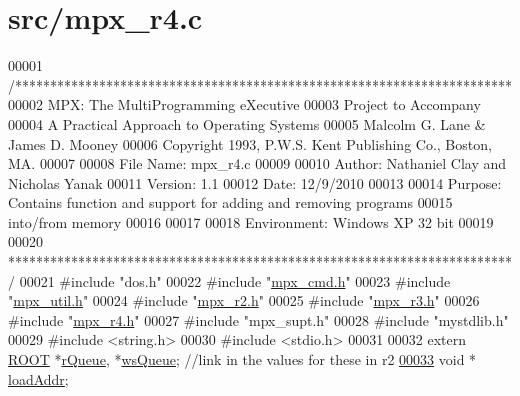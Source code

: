 \hypertarget{mpx__r4_8c_source}{
\section{src/mpx\_\-r4.c}
}

\begin{DoxyCode}
00001 \textcolor{comment}{/***********************************************************************}
00002 \textcolor{comment}{        MPX: The MultiProgramming eXecutive}
00003 \textcolor{comment}{        Project to Accompany}
00004 \textcolor{comment}{        A Practical Approach to Operating Systems}
00005 \textcolor{comment}{        Malcolm G. Lane & James D. Mooney}
00006 \textcolor{comment}{        Copyright 1993, P.W.S. Kent Publishing Co., Boston, MA.}
00007 \textcolor{comment}{}
00008 \textcolor{comment}{        File Name:      mpx\_r4.c}
00009 \textcolor{comment}{}
00010 \textcolor{comment}{        Author: Nathaniel Clay and Nicholas Yanak}
00011 \textcolor{comment}{        Version: 1.1}
00012 \textcolor{comment}{        Date:  12/9/2010}
00013 \textcolor{comment}{}
00014 \textcolor{comment}{        Purpose: Contains function and support for adding and removing programs }
00015 \textcolor{comment}{        into/from memory}
00016 \textcolor{comment}{}
00017 \textcolor{comment}{                }
00018 \textcolor{comment}{        Environment: Windows XP 32 bit}
00019 \textcolor{comment}{}
00020 \textcolor{comment}{************************************************************************/}
00021 \textcolor{preprocessor}{#include "dos.h"}
00022 \textcolor{preprocessor}{#include "\hyperlink{mpx__cmd_8h}{mpx_cmd.h}"}
00023 \textcolor{preprocessor}{#include "\hyperlink{mpx__util_8h}{mpx_util.h}"}
00024 \textcolor{preprocessor}{#include "\hyperlink{mpx__r2_8h}{mpx_r2.h}"}
00025 \textcolor{preprocessor}{#include "\hyperlink{_m_p_x___r3_8_h}{mpx_r3.h}"}
00026 \textcolor{preprocessor}{#include "\hyperlink{mpx__r4_8h}{mpx_r4.h}"}
00027 \textcolor{preprocessor}{#include "mpx\_supt.h"}
00028 \textcolor{preprocessor}{#include "mystdlib.h"}
00029 \textcolor{preprocessor}{#include <string.h>}
00030 \textcolor{preprocessor}{#include <stdio.h>}
00031 
00032 \textcolor{keyword}{extern} \hyperlink{structroot}{ROOT} *\hyperlink{mpx__r2_8c_afe54c168944e64a28d76b6e4d3abb391}{rQueue}, *\hyperlink{mpx__r2_8c_ac4950750e25f86d7ee69d6bcca87ef5f}{wsQueue}; \textcolor{comment}{//link in the values for these in r2}
\hypertarget{mpx__r4_8c_source_l00033}{}\hyperlink{mpx__r4_8c_a872ebd998619bdbaa3b905883e648502}{00033} \textcolor{keywordtype}{void} * \hyperlink{mpx__r4_8c_a872ebd998619bdbaa3b905883e648502}{loadAddr};

\end{DoxyCode}
